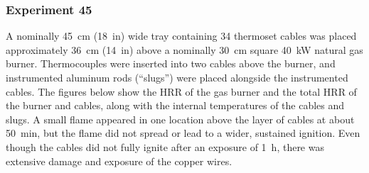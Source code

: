 \clearpage

\subsubsection{Experiment 45}

A nominally 45~cm (18~in) wide tray containing 34 thermoset cables was placed approximately 36~cm (14~in) above a nominally 30~cm square 40~kW natural gas burner. Thermocouples were inserted into two cables above the burner, and instrumented aluminum rods (``slugs'') were placed alongside the instrumented cables. The figures below show the HRR of the gas burner and the total HRR of the burner and cables, along with the internal temperatures of the cables and slugs. A small flame appeared in one location above the layer of cables at about 50~min, but the flame did not spread or lead to a wider, sustained ignition. Even though the cables did not fully ignite after an exposure of 1~h, there was extensive damage and exposure of the copper wires.

